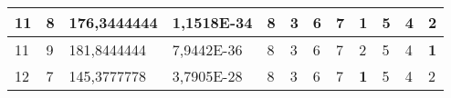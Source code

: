 \documentclass[conference]{IEEEtran}
\begin{document}
\begin{table*}[]
\begin{tabular}{|llll|llllllll|}
\multicolumn{1}{|l|}{11}                                                             & \multicolumn{1}{l|}{8}                                                                 & \multicolumn{1}{l|}{176,3444444}                                                           & 1,1518E-34                              & \multicolumn{1}{l|}{8}                                                           & \multicolumn{1}{l|}{3}                                                           & \multicolumn{1}{l|}{6}                                                           & \multicolumn{1}{l|}{7}                                                           & \multicolumn{1}{l|}{\textbf{1}}                                                  & \multicolumn{1}{l|}{5}                                                           & \multicolumn{1}{l|}{4}                                                           & 2                                   \\ \hline
\multicolumn{1}{|l|}{11}                                                             & \multicolumn{1}{l|}{9}                                                                 & \multicolumn{1}{l|}{181,8444444}                                                           & 7,9442E-36                              & \multicolumn{1}{l|}{8}                                                           & \multicolumn{1}{l|}{3}                                                           & \multicolumn{1}{l|}{6}                                                           & \multicolumn{1}{l|}{7}                                                           & \multicolumn{1}{l|}{2}                                                           & \multicolumn{1}{l|}{5}                                                           & \multicolumn{1}{l|}{4}                                                           & \textbf{1}                          \\ \hline
\multicolumn{1}{|l|}{12}                                                             & \multicolumn{1}{l|}{7}                                                                 & \multicolumn{1}{l|}{145,3777778}                                                           & 3,7905E-28                              & \multicolumn{1}{l|}{8}                                                           & \multicolumn{1}{l|}{3}                                                           & \multicolumn{1}{l|}{6}                                                           & \multicolumn{1}{l|}{7}                                                           & \multicolumn{1}{l|}{\textbf{1}}                                                  & \multicolumn{1}{l|}{5}                                                           & \multicolumn{1}{l|}{4}                                                           & 2                                   \\ \hline

\end{tabular}
\end{table*}
\end{document}

